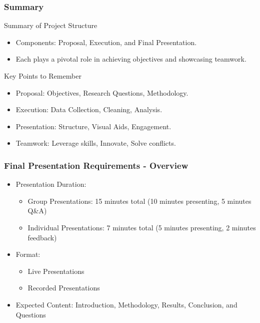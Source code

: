 \documentclass[aspectratio=169]{beamer}
\begin{document}
\begin{frame}[fragile]
    \frametitle{Summary}
    \begin{block}{Summary of Project Structure}
        \begin{itemize}
            \item Components: Proposal, Execution, and Final Presentation.
            \item Each plays a pivotal role in achieving objectives and showcasing teamwork.
        \end{itemize}
    \end{block}
    \begin{block}{Key Points to Remember}
        \begin{itemize}
            \item Proposal: Objectives, Research Questions, Methodology.
            \item Execution: Data Collection, Cleaning, Analysis.
            \item Presentation: Structure, Visual Aids, Engagement.
            \item Teamwork: Leverage skills, Innovate, Solve conflicts.
        \end{itemize}
    \end{block}
\end{frame}

\begin{frame}[fragile]
    \frametitle{Final Presentation Requirements - Overview}
    \begin{itemize}
        \item Presentation Duration: 
        \begin{itemize}
            \item Group Presentations: 15 minutes total (10 minutes presenting, 5 minutes Q\&A)
            \item Individual Presentations: 7 minutes total (5 minutes presenting, 2 minutes feedback)
        \end{itemize}
        \item Format: 
        \begin{itemize}
            \item Live Presentations
            \item Recorded Presentations
        \end{itemize}
        \item Expected Content: Introduction, Methodology, Results, Conclusion, and Questions
    \end{itemize}
\end{frame}
\end{document}
